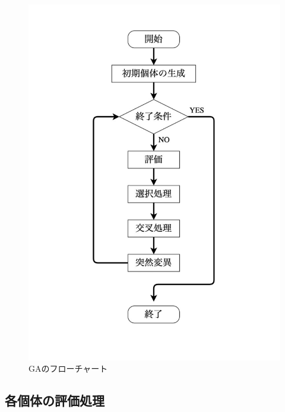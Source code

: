 \begin{figure}[p]
\begin{center}

\vspace{1.5cm}
\includegraphics[scale=0.7]{figurefolder/chapter2/GaFlowchart.pdf}
\caption{GAのフローチャート}
\label{遺伝的アルゴリズムのフローチャート}

\end{center}
\end{figure}

\clearpage


\subsection{各個体の評価処理}
\label{sec2.1.2}
  
